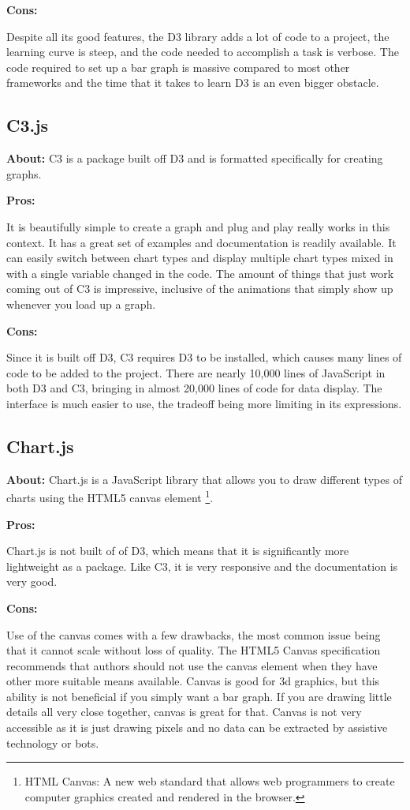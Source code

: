 \documentclass[draftclsnofoot,onecolumn,letterpaper,10pt,compsoc]{IEEEtran}
\begin{document}
  \textbf{Cons:}

  Despite all its good features, the D3 library adds a lot of code to a project, the learning curve is steep, and the code needed to accomplish a task is verbose.
  The code required to set up a bar graph is massive compared to most other frameworks and the time that it takes to learn D3 is an even bigger obstacle.

  \subsection{C3.js}
  \textbf{About:}
  C3 is a package built off D3 and is formatted specifically for creating graphs.

  \textbf{Pros:}

  It is beautifully simple to create a graph and plug and play really works in this context.
  It has a great set of examples and documentation is readily available.
  It can easily switch between chart types and display multiple chart types mixed in with a single variable changed in the code.
  The amount of things that just work coming out of C3 is impressive, inclusive of the animations that simply show up whenever you load up a graph.

  \textbf{Cons:}

  Since it is built off D3, C3 requires D3 to be installed, which causes many lines of code to be added to the project.
  There are nearly 10,000 lines of JavaScript in both D3 and C3, bringing in almost 20,000 lines of code for data display.
  The interface is much easier to use, the tradeoff being more limiting in its expressions.


  \subsection{Chart.js}
  \textbf{About:}
  Chart.js is a JavaScript library that allows you to draw different types of charts using the HTML5 canvas element
  \footnote{HTML Canvas: A new web standard that allows web programmers to create computer graphics created and rendered in the browser.}.

  \textbf{Pros:}

  Chart.js is not built of of D3, which means that it is significantly more lightweight as a package. Like C3, it is very responsive and the documentation is very good.

  \textbf{Cons:}

  Use of the canvas comes with a few drawbacks, the most common issue being that it cannot scale without loss of quality.
  The HTML5 Canvas specification recommends that authors should not use the canvas element when they have other more suitable means available.\cite{CanvasVsSVG}
  Canvas is good for 3d graphics, but this ability is not beneficial if you simply want a bar graph.
  If you are drawing little details all very close together, canvas is great for that.
  Canvas is not very accessible as it is just drawing pixels and no data can be extracted by assistive technology or bots.
\end{document}

